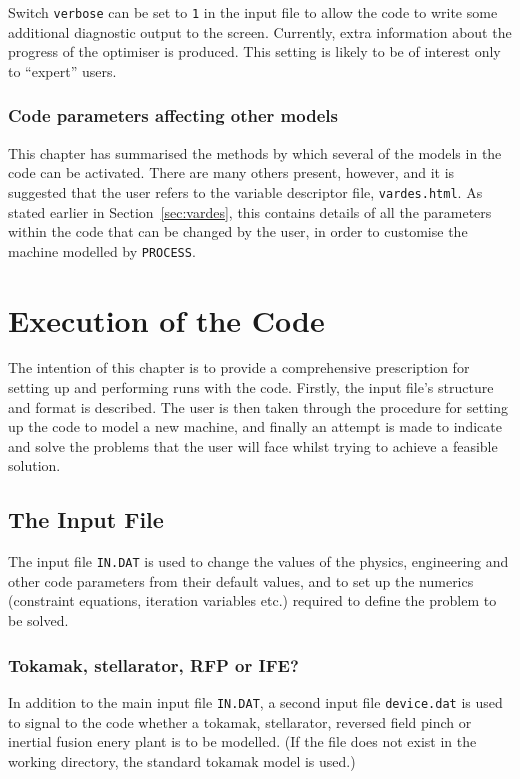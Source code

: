 \documentclass[11pt,a4paper]{report}
\newcommand{\process}{\mbox{\texttt{PROCESS}}}
\newcommand{\setheader}[1]
 {\markright{\rlap{\lower0.8ex\hbox to\textwidth{\hrulefill}}{\bf#1}}}
\newcommand{\mychapter}[1]{\small\normalsize
 \setcounter{footnote}{0}
 \chapter{#1}
 \pagestyle{myheadings}
 \setheader{Chapter \thechapter\hspace{0.8em}#1}}
\begin{document}
Switch \texttt{verbose} can be set to \texttt{1} in the input file to allow
the code to write some additional diagnostic output to the screen. Currently,
extra information about the progress of the optimiser is produced. This
setting is likely to be of interest only to ``expert'' users.

\subsection{Code parameters affecting other models}

This chapter has summarised the methods by which several of the models in the
code can be activated. There are many others present, however, and it is
suggested that the user refers to the variable descriptor file,
\texttt{vardes.html}. As stated earlier in Section~\ref{sec:vardes}, this
contains details of all the parameters within the code that can be changed by
the user, in order to customise the machine modelled by \process.


\mychapter{Execution of the Code}
\label{chap:run}

The intention of this chapter is to provide a comprehensive prescription for
setting up and performing runs with the code.  Firstly, the input file's
structure and format is described. The user is then taken through the
procedure for setting up the code to model a new machine, and finally an
attempt is made to indicate and solve the problems that the user will face
whilst trying to achieve a feasible solution.

\section{The Input File}
\label{sec:infile}

The input file \texttt{IN.DAT} is used to change the values of the physics,
engineering and other code parameters from their default values, and to set up
the numerics (constraint equations, iteration variables etc.) required to
define the problem to be solved.

\subsection{Tokamak, stellarator, RFP or IFE?}
\label{sec:device}

In addition to the main input file \texttt{IN.DAT}, a second input file
\texttt{device.dat} is used to signal to the code whether a tokamak,
stellarator, reversed field pinch or inertial fusion enery plant is to be
modelled. (If the file does not exist in the working directory, the standard
tokamak model is used.)
\end{document}
